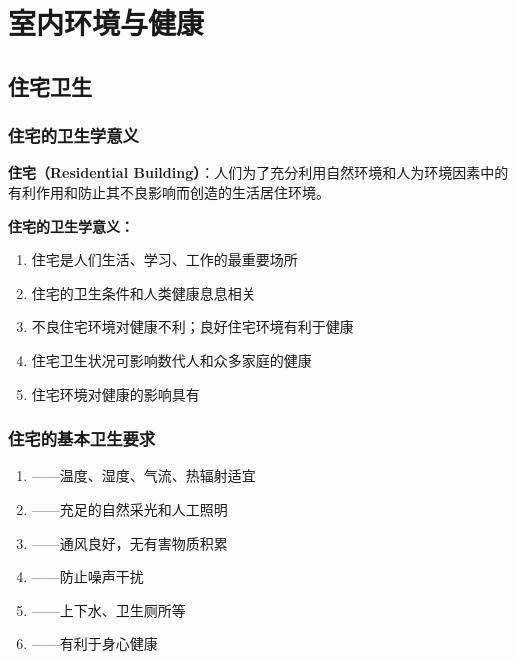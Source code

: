 \chapter{室内环境与健康}
\setcounter{chapter}{4}

\section{住宅卫生}

\subsection{住宅的卫生学意义}

\begin{defbox}
\textbf{住宅（Residential Building）}：人们为了充分利用自然环境和人为环境因素中的有利作用和防止其不良影响而创造的生活居住环境。
\end{defbox}

\textbf{住宅的卫生学意义：}
\begin{enumerate}[leftmargin=*]
    \item 住宅是人们生活、学习、工作的最重要场所
    \item 住宅的卫生条件和人类健康息息相关
    \item 不良住宅环境对健康不利；良好住宅环境有利于健康
    \item 住宅卫生状况可影响数代人和众多家庭的健康
    \item 住宅环境对健康的影响具有
\end{enumerate}

\subsection{住宅的基本卫生要求}

\begin{enumerate}[leftmargin=*]
    \item {}——温度、湿度、气流、热辐射适宜
    \item {}——充足的自然采光和人工照明
    \item {}——通风良好，无有害物质积累
    \item {}——防止噪声干扰
    \item {}——上下水、卫生厕所等
    \item {}——有利于身心健康
\end{enumerate}

